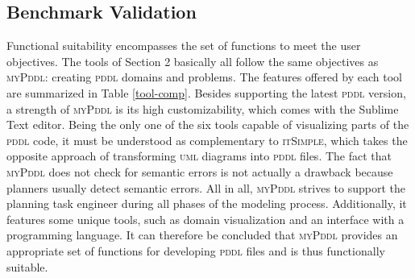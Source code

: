\documentclass[runningheads]{llncs}
\newcommand{\mypddl}{\textsc{myPddl}\xspace}
\newcommand{\itsimple}{\textsc{itSimple}\xspace}
\newcommand{\pddl}{\textsc{pddl}\xspace}
\newcommand{\uml}{\textsc{uml}\xspace}
\newcommand{\sublimetext}{Sublime Text\xspace}
\begin{document}
\subsection{Benchmark Validation}

Functional suitability encompasses the set of functions to meet the
user objectives. The tools of Section 2 basically all follow the same
objectives as \mypddl: creating \pddl domains and problems. The
features offered by each tool are summarized in Table
\ref{tool-comp}. Besides supporting the latest \pddl version, a
strength of \mypddl is its high customizability, which comes with the
\sublimetext editor. Being the only one of the six tools capable of
visualizing parts of the \pddl code, it must be understood as
complementary to \itsimple, which takes the opposite approach of
transforming \uml diagrams into \pddl files. The fact that \mypddl
does not check for semantic errors is not actually a drawback because
planners usually detect semantic errors. All in all, \mypddl strives
to support the planning task engineer during all phases of the
modeling process. Additionally, it features some unique tools, such as
domain visualization and an interface with a programming language. It
can therefore be concluded that \mypddl provides an appropriate set of
functions for developing \pddl files and is thus functionally
suitable.
\end{document}
